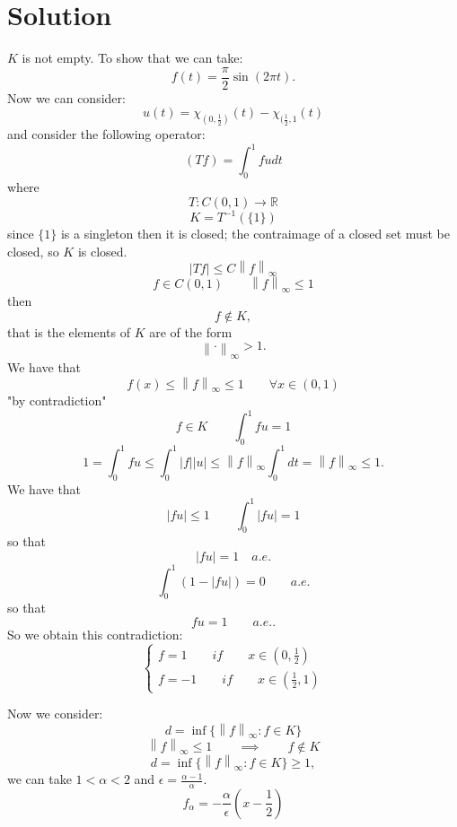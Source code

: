 \documentclass[a4paper, twoside, openany]{book}
\newcommand{\norm}[1]{\left\lVert#1\right\rVert}
\begin{document}
\section*{Solution}
$K$ is not empty. To show that we can take:
$$f(t) = \frac{\pi}{2} \sin(2 \pi t).$$
Now we can consider:
$$u(t) = \chi_{(0, \frac{1}{2})}(t) - \chi_{(\frac{1}{2}, 1}(t)$$
and consider the following operator:
$$(Tf) = \int_0^1 f u dt$$
where
$$T: C(0, 1) \rightarrow \mathbb{R}$$
$$K = T^{-1}(\{ 1 \})$$
since $\{ 1 \}$ is a singleton then it is closed; the contraimage of a closed set must be closed, so $K$ is closed.
$$|Tf| \leq C \norm{f}_{\infty}$$
$$f \in C(0, 1) \qquad \norm{f}_{\infty} \leq 1$$
then
$$f \notin K,$$
that is the elements of $K$ are of the form
$$\norm{ \cdot }_{\infty} > 1.$$
We have that 
$$f(x) \leq \norm{f}_{\infty} \leq 1 \qquad \forall x \in (0, 1)$$
"by contradiction"
$$f \in K \qquad \int_0^1 f u = 1$$
$$1 = \int_0^1 f u \leq \int_0^1 |f| |u| \leq \norm{f}_{\infty} \int_0^1 dt = \norm{f}_{\infty} \leq 1.$$
We have that
$$|f u| \leq 1 \qquad \int_0^1 |f u| = 1$$
so that
$$| f u | = 1 \quad a.e.$$
$$\int_0^1( 1 - | f u|) = 0 \qquad a.e.$$
so that
$$f u = 1 \qquad a.e. .$$
So we obtain this contradiction:
$$\begin{cases}
		f = 1 \qquad if \qquad x \in (0, \frac{1}{2}) \\
		f = -1 \qquad if \qquad x \in (\frac{1}{2}, 1)
  \end{cases}
$$
\begin{figure}[!ht]
\begin{center}
\end{center}
\end{figure}
Now we consider:
$$d = \inf \{ \norm{ f }_{\infty} : f \in K \}$$
$$\norm{ f }_{\infty} \leq 1 \qquad \implies \qquad f \notin K$$
$$d = \inf \{ \norm{ f }_{\infty} : f \in K \} \geq 1,$$
we can take $1 < \alpha < 2$ and $\epsilon = \frac{\alpha - 1}{\alpha}$.
$$f_{\alpha} = -\frac{\alpha}{\epsilon}(x - \frac{1}{2})$$
\end{document}
